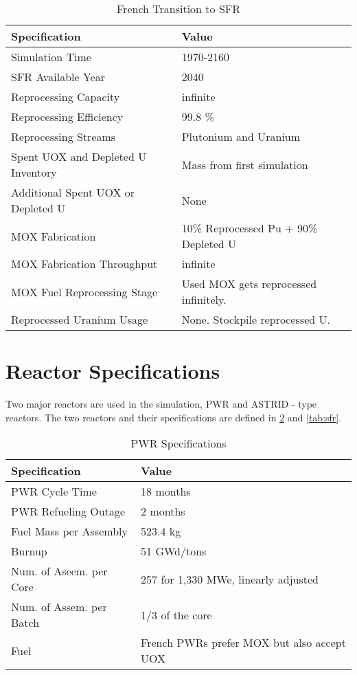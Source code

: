 \begin{table}[h]
	\centering
	\begin{tabularx}{\textwidth}{bb}
		\hline
		Specification & Value \\
		\hline
		Simulation Time & 1970-2160 \\
		\gls{SFR} Available Year & 2040 \\
		Reprocessing Capacity & infinite \\
		Reprocessing Efficiency & 99.8 \% \\
		Reprocessing Streams & Plutonium and Uranium \\
		\small{Spent \gls{UOX} and Depleted U Inventory} & Mass from first simulation \\
		\small{Additional Spent \gls{UOX} or Depleted U} & None  \\
		\gls{MOX} Fabrication &  \small{10\% Reprocessed Pu + 90\% Depleted U}  \\
		\gls{MOX} Fabrication Throughput & infinite \\
		\gls{MOX} Fuel Reprocessing Stage &  Used \gls{MOX} gets reprocessed infinitely. \\
		Reprocessed Uranium Usage &  None. Stockpile reprocessed U. \\
		\hline
	\end{tabularx}
	\caption {French Transition to \gls{SFR}}
	\label{tab:sim_france}
\end{table}


\section{Reactor Specifications}
Two major reactors are used in the simulation, \gls{PWR} and ASTRID - type reactors.
The two reactors and their specifications are defined in \cref{tab:pwr} and \cref{tab:sfr}.

\begin{table}[h]
	\centering
	\begin{tabularx}{\textwidth}{bb}
		\hline
		Specification & Value \\
		\hline
		PWR Cycle Time & 18 months \\ 
		PWR Refueling Outage & 2 months \\
		Fuel Mass per Assembly & 523.4 kg \\
		Burnup & 51 GWd/tons \\
		Num. of Aseem. per Core & 257 for 1,330 MWe, linearly adjusted\\
		Num. of Assem. per Batch & 1/3 of the core \\
		Fuel & \small{French \glspl{PWR} prefer \gls{MOX} but also accept \gls{UOX}}\\
		\hline
	\end{tabularx}
	\caption {\gls{PWR} Specifications}
	\label{tab:pwr}
	\end{table}
	
